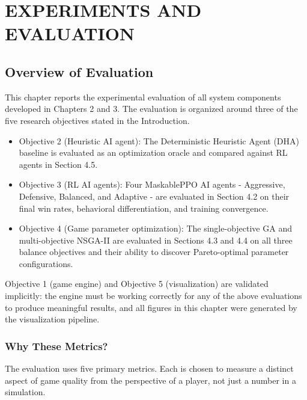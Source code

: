 \clearpage
{}
\chapter{EXPERIMENTS AND EVALUATION}
\label{chap:results}

\section{Overview of Evaluation}

This chapter reports the experimental evaluation of all system components developed in Chapters 2 and 3. The evaluation is organized around three of the five research objectives stated in the Introduction.

\begin{itemize}
    \item Objective 2 (Heuristic AI agent): The Deterministic Heuristic Agent (DHA) baseline is evaluated as an optimization oracle and compared against RL agents in Section 4.5.
    \item Objective 3 (RL AI agents): Four MaskablePPO AI agents - Aggressive, Defensive, Balanced, and Adaptive - are evaluated in Section 4.2 on their final win rates, behavioral differentiation, and training convergence.
    \item Objective 4 (Game parameter optimization): The single-objective GA and multi-objective NSGA-II are evaluated in Sections 4.3 and 4.4 on all three balance objectives and their ability to discover Pareto-optimal parameter configurations.
\end{itemize}

Objective 1 (game engine) and Objective 5 (visualization) are validated implicitly: the engine must be working correctly for any of the above evaluations to produce meaningful results, and all figures in this chapter were generated by the visualization pipeline.

\subsection{Why These Metrics?}

The evaluation uses five primary metrics. Each is chosen to measure a distinct aspect of game quality from the perspective of a player, not just a number in a simulation.

